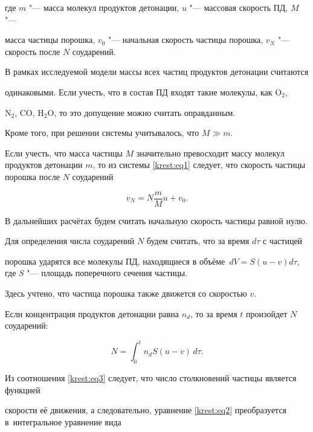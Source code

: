 где $m$ "--- масса молекул продуктов детонации, $u$ "--- массовая скорость ПД, $M$ "---

масса частицы порошка, $v_{0}$ "--- начальная скорость частицы порошка, $v_{N}$ "--- скорость после $N$ соударений.



В рамках исследуемой модели массы всех частиц продуктов детонации считаются

одинаковыми. Если учесть, что в состав ПД входят такие молекулы, как O$_2$,

N$_2$, CO, H$_2$O, то это допущение можно считать оправданным. 

Кроме того, при решении системы учитывалось, что $M\gg m$. 

Если учесть, что масса частицы $M$ значительно превосходит массу молекул продуктов детонации $m$, то из системы \eqref{krest:eq1} следует, что скорость частицы порошка после $N$ соударений 

\begin{equation}

\label{krest:eq2}

v_N =N \frac{m}{M} u+v_0.

\end{equation}



В дальнейших расчётах будем считать начальную скорость частицы равной нулю. 

Для определения числа соударений $N$ будем считать, что за время $d\tau$ с частицей

порошка ударятся все молекулы ПД, находящиеся в объёме~$dV =S (u-v) d\tau$, где $S$ "--- площадь поперечного сечения частицы. 

Здесь учтено, что частица порошка также движется со скоростью $v$. 

Если концентрация продуктов детонации равна $n_d$, то за время $t$ произойдет $N$ соударений:

\begin{equation}

\label{krest:eq3}

N=\int_0^t n_d S  (u-v)\, d\tau.

\end{equation}



Из соотношения \eqref{krest:eq3} следует, что число столкновений частицы является функцией

скорости её движения, а следовательно, уравнение \eqref{krest:eq2} преобразуется в~интегральное уравнение вида

